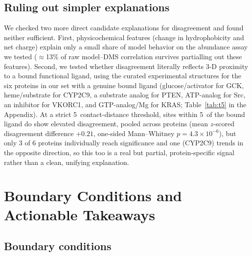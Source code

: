 \documentclass{article}
\begin{document}
\subsection{Ruling out simpler explanations}
\label{sec:trivial}

We checked two more direct candidate explanations for disagreement and found neither sufficient. First, physicochemical features (change in hydrophobicity and net charge) explain only a small share of model behavior on the abundance assay we tested ($\approx$13\% of raw model--DMS correlation survives partialling out these features). Second, we tested whether disagreement literally reflects 3-D proximity to a bound functional ligand, using the curated experimental structures for the six proteins in our set with a genuine bound ligand (glucose/activator for GCK, heme/substrate for CYP2C9, a substrate analog for PTEN, ATP-analog for Src, an inhibitor for VKORC1, and GTP-analog/Mg for KRAS; Table~\ref{tab:t5} in the Appendix). At a strict 5\,\text{\AA} contact-distance threshold, sites within 5\,\text{\AA} of the bound ligand do show elevated disagreement, pooled across proteins (mean $z$-scored disagreement difference $+0.21$, one-sided Mann--Whitney $p=4.3\times10^{-6}$), but only 3 of 6 proteins individually reach significance and one (CYP2C9) trends in the opposite direction, so this too is a real but partial, protein-specific signal rather than a clean, unifying explanation.

\section{Boundary Conditions and Actionable Takeaways}
\label{sec:boundary}

\subsection{Boundary conditions}
\end{document}
